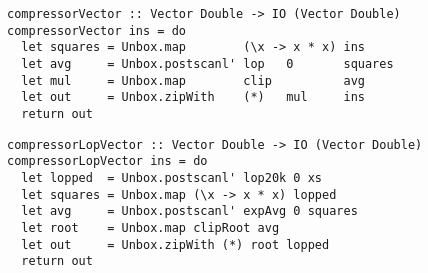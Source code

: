 \begin{lstlisting}[float=ht,label=l:a:bench:compressorVector,caption=Vector implementation of \Hs/compressor/]
compressorVector :: Vector Double -> IO (Vector Double)
compressorVector ins = do
  let squares = Unbox.map        (\x -> x * x) ins
  let avg     = Unbox.postscanl' lop   0       squares
  let mul     = Unbox.map        clip          avg
  let out     = Unbox.zipWith    (*)   mul     ins
  return out
\end{lstlisting}


\begin{lstlisting}[float=ht,label=l:a:bench:compressorLopVector,caption=Vector implementation of \Hs/compressor/ with low-pass]
compressorLopVector :: Vector Double -> IO (Vector Double)
compressorLopVector ins = do
  let lopped  = Unbox.postscanl' lop20k 0 xs
  let squares = Unbox.map (\x -> x * x) lopped
  let avg     = Unbox.postscanl' expAvg 0 squares
  let root    = Unbox.map clipRoot avg
  let out     = Unbox.zipWith (*) root lopped
  return out
\end{lstlisting}

% 

